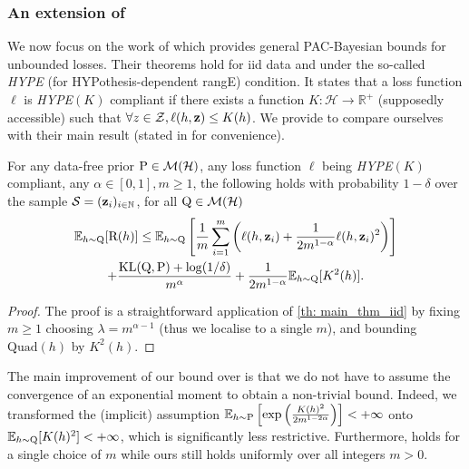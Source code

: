 \subsubsection{An extension of \citet{haddouche2021pac}}

We now focus on the work of \citet{haddouche2021pac} which provides general PAC-Bayesian bounds for unbounded losses. Their theorems hold for iid data and under the so-called \emph{HYPE} (for HYPothesis-dependent rangE) condition. It states that a loss function $\ell$ is \emph{HYPE}$(K)$ compliant if there exists a function $K:\mathcal{H} \rightarrow \mathbb{R}^+ $ (supposedly accessible)  such that $\forall z\in\mathcal{Z}, \ell(h,\z) \leq K(h)$.
We provide  to compare ourselves with their main result (stated in   for convenience).
\begin{corollary}
\label{cor: haddouche_comparison}
For any data-free prior $\P\in \mathcal{M}(\mathcal{H})$, any loss function $\ell$ being \emph{HYPE}$(K)$ compliant, any $\alpha\in[0,1],m\geq 1$, the following holds with probability $1-\delta$ over the sample $\S=(\z_i)_{i\in\mathbb{N}}$, for all $\Q\in\mathcal{M}(\mathcal{H})$
\begin{multline*}
\mathbb{E}_{h\sim \Q} [\Risk(h)] \leq   \mathbb{E}_{h\sim \Q} \left[\frac{1}{m}\sum_{i=1}^m\left(\ell(h,\z_i) + \frac{1}{2m^{1-\alpha}} \ell(h,\z_i)^2\right)\right] \\
+ \frac{\operatorname{KL}(\Q,\P) +\log(1/\delta)}{m^{\alpha}}  + \frac{1}{2m^{1-\alpha}}\mathbb{E}_{h\sim \Q} [K^2(h)].
\end{multline*}
\end{corollary}

\begin{proof}
The proof is a straightforward application of \cref{th: main_thm_iid} by fixing $m\geq 1$ choosing $\lambda= m^{\alpha-1}$ (thus we localise  to a single $m$),  and bounding $\mathrm{Quad}(h)$ by $K^2(h)$.
\end{proof}
The main improvement of our bound over  is that we do not have to assume the convergence of an exponential moment to obtain a non-trivial bound. Indeed, we transformed the (implicit) assumption $\mathbb{E}_{h\sim \P} \left[\exp\left( \frac{K(h)^2}{2m^{1-2\alpha}} \right) \right] < +\infty $ onto $\mathbb{E}_{h\sim \Q}[K(h)^2] < +\infty$, which is significantly less restrictive.
Furthermore,  holds for a single choice of $m$ while ours still holds uniformly over all integers $m>0$.

